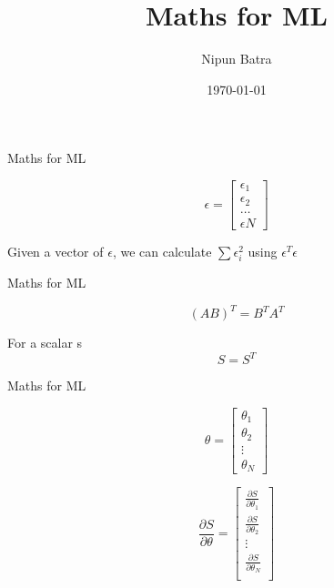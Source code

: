 \documentclass{beamer}
\title{Maths for ML}
\date{\today}
\author{Nipun Batra}
\institute{IIT Gandhinagar}
\begin{document}
  \maketitle
  
  
  

\begin{frame}{Maths for ML}

$$
\epsilon = \begin{bmatrix}
    \epsilon_{1}   \\
    \epsilon_{2}   \\
    \dots \\
    \epsilon{N}
\end{bmatrix}    
$$

Given a vector of $\epsilon$, we can calculate $\sum \epsilon_{i}^{2}$ using $\epsilon^{T}\epsilon$
\end{frame}

\begin{frame}{Maths for ML}

$$
(AB)^{T} = B^{T}A^{T}    
$$



For a scalar s
$$
S = S^{T}    
$$

\end{frame}


\begin{frame}{Maths for ML}

    
    
  \begin{equation*}
      \theta = \begin{bmatrix}
  \theta_{1}\\
  \theta_{2}\\
  \vdots\\
  \theta_{N}
    \end{bmatrix}   
  
  \end{equation*} 


   
 
  \begin{equation*}
        \frac{\partial S}{\partial \theta} = \begin{bmatrix}
  \frac{\partial S}{\partial \theta_{1}}\\
  \frac{\partial S}{\partial \theta_{2}}\\
    \vdots\\
  \frac{\partial S}{\partial \theta_{N}}\\
    \end{bmatrix}
  \end{equation*}
      
    
    

\end{frame}
\end{document}
